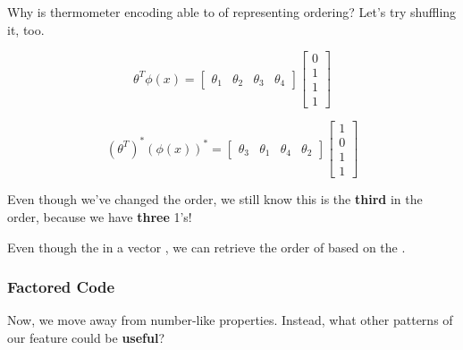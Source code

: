                Why is thermometer encoding able to of representing ordering? Let's try shuffling it, too.

                \begin{equation}
                    \theta^T \phi(x) = 
                    \begin{bmatrix}
                        \theta_1 & \theta_2 & \theta_3 & \theta_4
                    \end{bmatrix}
                    \begin{bmatrix}
                        0\\1\\1\\1
                    \end{bmatrix}
                \end{equation}

                \begin{equation}
                    (\theta^T)^* (\phi(x))^* = 
                    \begin{bmatrix}
                        \theta_3 & \theta_1 & \theta_4 & \theta_2
                    \end{bmatrix}
                    \begin{bmatrix}
                        1 \\ 0 \\ 1 \\ 1
                    \end{bmatrix}
                \end{equation}

                Even though we've changed the order, we still know this is the \textbf{third} in the order, because we have \textbf{three} 1's!\\

                \begin{concept}
                    Even though the  in a vector , we can retrieve the order of  based on the .
                \end{concept}
            
            \subsecdiv
            \subsubsection*{Factored Code}

                Now, we move away from number-like properties. Instead, what other patterns of our feature could be \textbf{useful}?

